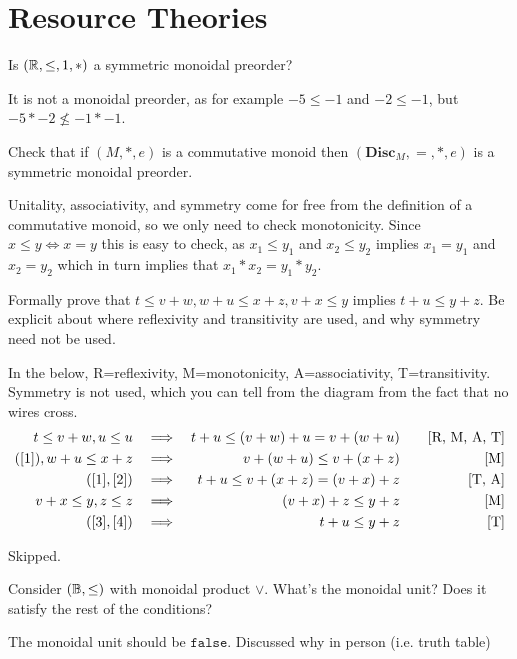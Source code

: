 \chapter{Resource Theories}

Is $(\mathbb{R}, \leq, 1, *)$ a symmetric monoidal preorder?

\solution
It is not a monoidal preorder, as for example $-5\leq -1$ and $-2\leq -1$, but $-5*-2\nleq -1*-1$.

Check that if $(M, *,e)$ is a commutative monoid then $(\textbf{Disc}_M,=,*,e)$ is a symmetric monoidal preorder.

\solution
Unitality, associativity, and symmetry come for free from the definition of a commutative monoid, so we only need to check monotonicity.  Since $x\leq y\iff x=y$ this is easy to check, as $x_1\leq y_1$ and $x_2\leq y_2$ implies $x_1=y_1$ and $x_2=y_2$ which in turn implies that $x_1*x_2 = y_1 * y_2$.

\newpage

Formally prove that $t\leq v+w, w+u\leq x+z, v+x\leq y$ implies $t+u\leq y+z$.  Be explicit about where reflexivity and transitivity are used, and why symmetry need not be used.

\solution
In the below, R=reflexivity, M=monotonicity, A=associativity, T=transitivity.  Symmetry is not used, which you can tell from the diagram from the fact that no wires cross.
\begin{align}
	t\leq v+w, u\leq u &&\implies&& t+u\leq (v+w)+u = v+(w+u) &\quad& \textrm{[R, M, A, T]}\label{1} \\
	(\ref{1}),w+u\leq x+z &&\implies&& v+(w+u)\leq v+(x+z) &\quad& \textrm{[M]}\label{2} \\
	(\ref{1},\ref{2}) &&\implies&& t+u\leq v+(x+z) = (v+x)+z &\quad& \textrm{[T, A]}\label{3} \\
	v+x\leq y, z\leq z &&\implies&& (v+x)+z\leq y+z &\quad& \textrm{[M]}\label{4} \\
	(\ref{3},\ref{4}) &&\implies&& t+u\leq y+z &\quad& \textrm{[T]}\label{5}
\end{align}

Skipped.

Consider $(\mathbb{B},\leq)$ with monoidal product $\lor$.  What's the monoidal unit?  Does it satisfy the rest of the conditions?

\solution
The monoidal unit should be $\texttt{false}$.  Discussed why in person (i.e. truth table)

